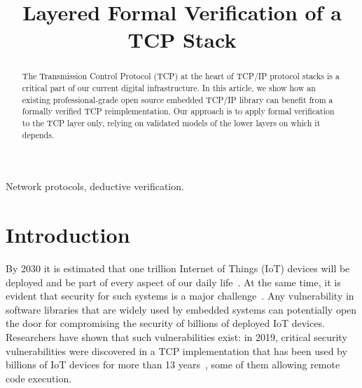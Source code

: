 \documentclass[conference]{IEEEtran}
\begin{document}
\title{Layered Formal Verification of a TCP Stack}

\author{%
\and
{}
\and
{}
\and
{}
}

\maketitle

\begin{abstract}
The Transmission Control Protocol (TCP) at the heart of TCP/IP protocol stacks
is a critical part of our current digital infrastructure. In this article, we
show how an existing professional-grade open source embedded TCP/IP library can
benefit from a formally verified TCP reimplementation. Our approach is to apply
formal verification to the TCP layer only, relying on validated models of the
lower layers on which it depends.
\end{abstract}

\begin{IEEEkeywords}
Network protocols,
deductive verification.
\end{IEEEkeywords}

\section{Introduction}

By 2030 it is estimated that one trillion Internet of Things (IoT) devices will be deployed and be part of every aspect of our daily life~\cite{IoT_route:ARM_white_paper}. At the same time, it is evident that security for such systems is a major challenge~\cite{Sec_IoT_Challenges:paper,Cyber_Systems_security:paper}. Any vulnerability in software libraries that are widely used by embedded systems can potentially open the door for compromising the security of billions of deployed IoT devices. Researchers have shown that such vulnerabilities exist: in 2019, critical security vulnerabilities were discovered in a TCP implementation that has been used by billions of IoT devices for more than 13 years~\cite{zero_days_vuln:ARMIS_white_paper}, some of them allowing remote code execution.
\end{document}

